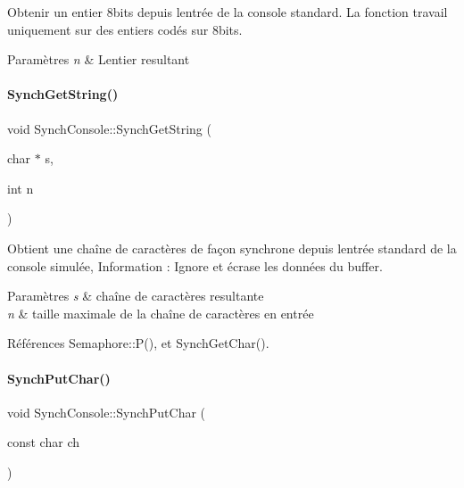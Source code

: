 Obtenir un entier 8bits depuis l\textquotesingle{}entrée de la console standard. La fonction travail uniquement sur des entiers codés sur 8bits. 


\begin{DoxyParams}{Paramètres}
{\em n} & L\textquotesingle{}entier resultant \\
\hline
\end{DoxyParams}
\hypertarget{class_synch_console_a632abb28f8b2bdbd5d9c69adf364f013}{}\label{class_synch_console_a632abb28f8b2bdbd5d9c69adf364f013} 
\paragraph{\texorpdfstring{Synch\+Get\+String()}{SynchGetString()}}
{\footnotesize\ttfamily void Synch\+Console\+::\+Synch\+Get\+String (\begin{DoxyParamCaption}\item[{char $\ast$}]{s,  }\item[{int}]{n }\end{DoxyParamCaption})}



Obtient une chaîne de caractères de façon synchrone depuis l\textquotesingle{}entrée standard de la console simulée, Information \+: Ignore et écrase les données du buffer. 


\begin{DoxyParams}{Paramètres}
{\em s} & chaîne de caractères resultante \\
\hline
{\em n} & taille maximale de la chaîne de caractères en entrée \\
\hline
\end{DoxyParams}


Références Semaphore\+::\+P(), et Synch\+Get\+Char().

\hypertarget{class_synch_console_a20b9d14d9173609f843d926e18fdd8ac}{}\label{class_synch_console_a20b9d14d9173609f843d926e18fdd8ac} 
\paragraph{\texorpdfstring{Synch\+Put\+Char()}{SynchPutChar()}}
{\footnotesize\ttfamily void Synch\+Console\+::\+Synch\+Put\+Char (\begin{DoxyParamCaption}\item[{const char}]{ch }\end{DoxyParamCaption})}



